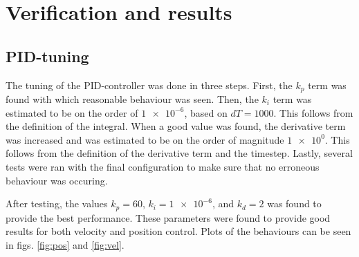 \documentclass[11pt]{article}
\begin{document}



\section{Verification and results}
\subsection{PID-tuning}
The tuning of the PID-controller was done in three steps. First, the $k_p$ term was found with which reasonable behaviour was seen. Then, the $k_i$ term was estimated to be on the order of $\num{1e-6}$, based on $dT=1000$. This follows from the definition of the integral. When a good value was found, the derivative term was increased and was estimated to be on the order of magnitude $\num{1e0}$. This follows from the definition of the derivative term and the timestep. Lastly, several tests were ran with the final configuration to make sure that no erroneous behaviour was occuring. \par

After testing, the values $k_p = 60$, $k_i = \num{1e-6}$, and $k_d = 2$ was found to provide the best performance. These parameters were found to provide good results for both velocity and position control. Plots of the behaviours can be seen in figs. \ref{fig:pos} and \vref{fig:vel}. \par
\end{document}
